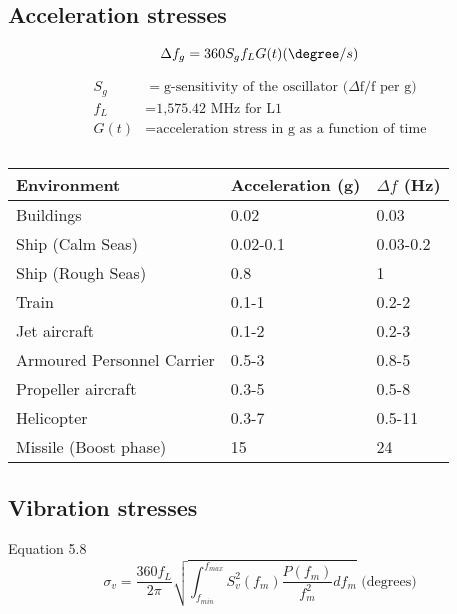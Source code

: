 

\subsection{Acceleration stresses}

\begin{equation}
\Delta f_g = 360 S_g f_L G(t) (\degree/s)
\end{equation}

\begin{align*}
S_g &= \text{g-sensitivity of the oscillator (}\Delta \text{f/f per g)}\\
f_L &= \text{1,575.42 MHz for L1} \\
G(t) &= \text{acceleration stress in g as a function of time}
\end{align*}


\begin{table}[!htb]
\centering
\begin{tabular}{|l|l|l|}
\hline
\rowcolor[HTML]{C0C0C0} 
Environment                 & Acceleration (g) & $\Delta f$ (Hz) \\ \hline
Buildings                  & 0.02        &    0.03\\ \hline
\rowcolor[HTML]{EFEFEF} 
Ship (Calm Seas)           & 0.02-0.1    &  0.03-0.2     \\ \hline
Ship (Rough Seas)          & 0.8    &     1          \\ \hline
\rowcolor[HTML]{EFEFEF} 
Train                      & 0.1-1        & 0.2-2              \\ \hline
Jet aircraft               & 0.1-2        & 0.2-3              \\ \hline
\rowcolor[HTML]{EFEFEF} 
Armoured Personnel Carrier & 0.5-3         &  0.8-5             \\ \hline
Propeller aircraft         & 0.3-5         & 0.5-8             \\ \hline
\rowcolor[HTML]{EFEFEF} 
Helicopter                 & 0.3-7         & 0.5-11              \\ \hline
Missile (Boost phase)      & 15          &  24             \\ \hline
\end{tabular}
\caption{\cite{CrystalVibration}}
\label{VibrationLevelsTable}
\end{table}

\subsection{Vibration stresses}
Equation 5.8
\begin{equation}
\sigma_v = \frac{360f_L}{2\pi}\sqrt{\int_{f_{min}}^{f_{max}} S^2_v(f_m) \frac{P(f_m)}{f^2_m} df_m}\text{ (degrees)}
\end{equation}

